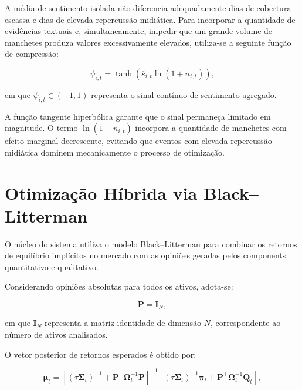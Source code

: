 A média de sentimento isolada não diferencia adequadamente dias de cobertura escassa e dias de elevada repercussão midiática. Para incorporar a quantidade de evidências textuais e, simultaneamente, impedir que um grande volume de manchetes produza valores excessivamente elevados, utiliza-se a seguinte função de compressão:

\begin{equation}
    \psi_{i,t}
    =
    \tanh
    \left(
        \overline{s}_{i,t}
        \ln(1+n_{i,t})
    \right),
    \label{eq:sinal_continuo}
\end{equation}

em que $\psi_{i,t}\in(-1,1)$ representa o sinal contínuo de sentimento agregado.

A função tangente hiperbólica garante que o sinal permaneça limitado em magnitude. O termo $\ln(1+n_{i,t})$ incorpora a quantidade de manchetes com efeito marginal decrescente, evitando que eventos com elevada repercussão midiática dominem mecanicamente o processo de otimização.

\section{Otimização Híbrida via Black--Litterman}
\label{sec:otimizacao_hibrida}

O núcleo do sistema utiliza o modelo Black--Litterman para combinar os retornos de equilíbrio implícitos no mercado com as opiniões geradas pelos components quantitativo e qualitativo.

Considerando opiniões absolutas para todos os ativos, adota-se:

\begin{equation}
    \boldsymbol{P}
    =
    \boldsymbol{I}_{N},
    \label{eq:matriz_p}
\end{equation}

em que $\boldsymbol{I}_{N}$ representa a matriz identidade de dimensão $N$, correspondente ao número de ativos analisados.

O vetor posterior de retornos esperados é obtido por:

\begin{equation}
    \boldsymbol{\mu}_t
    =
    \left[
        \left(
            \tau\boldsymbol{\Sigma}_t
        \right)^{-1}
        +
        \boldsymbol{P}^{\top}
        \boldsymbol{\Omega}_t^{-1}
        \boldsymbol{P}
    \right]^{-1}
    \left[
        \left(
            \tau\boldsymbol{\Sigma}_t
        \right)^{-1}
        \boldsymbol{\pi}_t
        +
        \boldsymbol{P}^{\top}
        \boldsymbol{\Omega}_t^{-1}
        \boldsymbol{Q}_t
    \right],
    \label{eq:bl_mu_update}
\end{equation}

